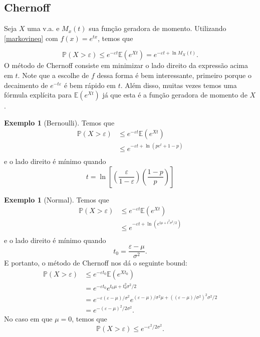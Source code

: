 \documentclass[12pt,a4paper,oneside]{book}
\theoremstyle{definition}
\newtheorem{example}[theorem]{Exemplo}
\theoremstyle{remark}
\numberwithin{equation}{section}
\newcommand{\e}{\varepsilon}
\newcommand{\E}{\mathbb{E}}
\newcommand{\pr}{\mathbb{P}}
\begin{document}
\subsection{Chernoff}
Seja $X$ uma v.a. e $M_x(t)$ sua função geradora de momento. Utilizando \ref{markovineq} com $f(x) = e^{tx}$, temos que


\begin{equation}\label{markovineq}
\pr(X>\e) \leq  e^{-\e t}\E(e^{Xt}) =  e^{-\e t  + \ln M_X(t)}.
\end{equation}
O método de Chernoff consiste em minimizar o lado direito da expressão acima em $t$. Note que a escolhe de $f$ dessa forma é bem interessante, primeiro porque o decaimento de $e^{-t\e}$ é bem rápido em $t$. Além disso, muitas vezes temos uma fórmula explícita para $\E(e^{Xt})$ já que esta é a função geradora de momento de $X$.

\begin{example}[Bernoulli]
Temos que 
\begin{align*}
\pr(X>\e) & \leq  e^{-\e t}\E(e^{Xt})\\
	& \leq  e^{-\e t + \ln( pe^t + 1-p) }\\
\end{align*} 
e o lado direito é mínimo quando 
$$t = \ln \left[\left( \dfrac{\e}{1-\e}\right)\left(\dfrac{1-p}{p} \right) \right]$$
\end{example}


\begin{example}[Normal]
Temos que 
\begin{align*}
\pr(X>\e) & \leq  e^{-\e t}\E(e^{Xt})\\
	& \leq  e^{-\e t + \ln( e^{t\mu + t^2\sigma^2/2}) }\\
\end{align*} 
e o lado direito é mínimo quando 
$$t_0 = \dfrac{\e-\mu}{\sigma^2}.$$
E portanto, o método de Chernoff nos dá o seguinte bound:
\begin{align*}
\pr(X>\e) & \leq  e^{-\e t_0}\E(e^{Xt_0})\\
		& = e^{-\e t_0}e^{t_0\mu + t_0^2\sigma^2/2}\\
		& = e^{-\e (\e-\mu)/\sigma^2}e^{(\e-\mu)/\sigma^2\mu + ((\e-\mu)/\sigma^2)^2\sigma^2/2}\\
	& = e^{ -(\e-\mu)^2/2\sigma^2}.
\end{align*}
 No caso em que $\mu=0$, temos que
$$ \pr(X>\e) \leq e^{ -\e^2/2\sigma^2}.$$
\end{example}
\end{document}
